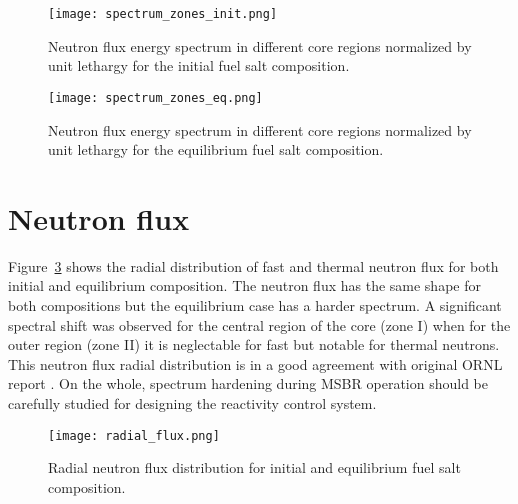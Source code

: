 \begin{figure}[htp!] %
  \centering
    \vspace{-0.3em}
  \texttt{[image: spectrum\_zones\_init.png]} 
  \caption{Neutron flux energy spectrum in different core regions normalized by unit lethargy for the initial fuel salt composition.}
    \vspace{-1.6em}
  \label{fig:spectrum_zones_init}
\end{figure}
\begin{figure}[htp!] %
  \centering
    \vspace{-0.3em}
  \texttt{[image: spectrum\_zones\_eq.png]} 
  \caption{Neutron flux energy spectrum in different core regions normalized by unit lethargy for the equilibrium fuel salt composition.}
    \vspace{-1.6em}
  \label{fig:spectrum_zones_eq}
\end{figure}
\FloatBarrier

\section{Neutron flux}
Figure~\ref{fig:radial_flux} shows the radial distribution of fast and thermal neutron flux for both initial and equilibrium composition. The neutron flux has the same shape for both compositions but the equilibrium case has a harder spectrum. A significant spectral shift was observed for the central region of the core (zone I) when for the outer region (zone II) it is neglectable for fast but notable for thermal neutrons. This neutron flux radial distribution is in a good agreement with original ORNL report \cite{robertson_conceptual_1971}. On the whole, spectrum hardening during \gls{MSBR} operation should be carefully studied for designing the reactivity control system.

\begin{figure}[htp!] %
  \centering
    \vspace{-0.3em}
  \texttt{[image: radial\_flux.png]} 
  \caption{Radial neutron flux distribution for initial and equilibrium fuel salt composition.}
    \vspace{-0.6em}
  \label{fig:radial_flux}
\end{figure}
\FloatBarrier

